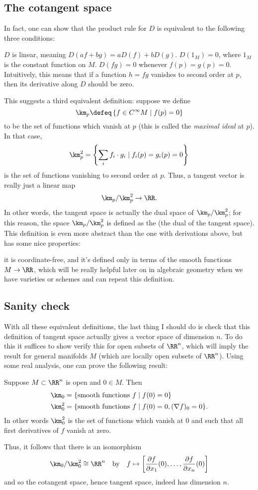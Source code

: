 \subsection{The cotangent space}
In fact, one can show that the product rule
for $D$ is equivalent to the following three conditions:
\begin{enumerate}
	\ii $D$ is linear, meaning $D(af+bg) = a D(f) + b D(g)$.
	\ii $D(1_M) = 0$, where $1_M$ is the constant function on $M$.
	\ii $D(fg) = 0$ whenever $f(p) = g(p) = 0$.
	Intuitively, this means that if a function $h = fg$
	vanishes to second order at $p$,
	then its derivative along $D$ should be zero.
\end{enumerate}

This suggests a third equivalent definition:
suppose we define
\[ \km_p \defeq \left\{ f \in C^\infty M \mid f(p) = 0 \right\} \]
to be the set of functions which vanish at $p$
(this is called the \emph{maximal ideal} at $p$).
In that case,
\[ \km_p^2 = \left\{ \sum_i f_i \cdot g_i
	\mid f_i(p) = g_i(p) = 0 \right\} \]
is the set of functions vanishing to second order at $p$.
Thus, a tangent vector is really just a linear map
\[ \km_p / \km_p^2 \to \RR. \]
In other words, the tangent space is actually the
dual space of $\km_p / \km_p^2$;
for this reason, the space $\km_p / \km_p^2$ is defined as the
 (the dual of the tangent space).
This definition is even more abstract than the one with derivations above,
but has some nice properties:
\begin{itemize}
	\ii it is coordinate-free, and
	\ii it's defined only in terms of the smooth functions $M \to \RR$,
	which will be really helpful later on in algebraic geometry
	when we have varieties or schemes and can repeat this definition.
\end{itemize}

\subsection{Sanity check}
With all these equivalent definitions, the last thing I should do is check that
this definition of tangent space actually gives a vector space of dimension $n$.
To do this it suffices to show verify this for open subsets of $\RR^n$,
which will imply the result for general manifolds $M$
(which are locally open subsets of $\RR^n$).
Using some real analysis, one can prove the following result:
\begin{theorem}
	Suppose $M \subset \RR^n$ is open and $0 \in M$.
	Then
	\[
	\begin{aligned}
		\km_0 &= \{ \text{smooth functions } f \mid f(0) = 0 \} \\
		\km_0^2 &= \{ \text{smooth functions } f \mid f(0) = 0, (\nabla f)_0 = 0 \}.
	\end{aligned}
	\]
	In other words $\km_0^2$ is the set of functions which vanish at $0$
	and such that all first derivatives of $f$ vanish at zero.
\end{theorem}
Thus, it follows that there is an isomorphism
\[ \km_0 / \km_0^2 \cong \RR^n
	\quad\text{by}\quad
	f \mapsto
	\left[ \frac{\partial f}{\partial x_1}(0),
		\dots, \frac{\partial f}{\partial x_n}(0) \right] \]
and so the cotangent space, hence tangent space,
indeed has dimension $n$.

